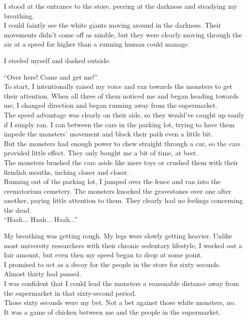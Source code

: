 I stood at the entrance to the store, peering at the darkness and steadying my breathing.\\
I could faintly see the white giants moving around in the darkness. Their movements didn't come off as nimble, but they were clearly moving through the air at a speed far higher than a running human could manage.

I steeled myself and dashed outside.

``Over here! Come and get me!'' \\
To start, I intentionally raised my voice and ran towards the monsters to get their attention. When all three of them noticed me and began heading towards me, I changed direction and began running away from the supermarket. \\
The speed advantage was clearly on their side, so they would've caught up easily if I simply ran. I ran between the cars in the parking lot, trying to have them impede the monsters' movement and block their path even a little bit. \\
But the monsters had enough power to chew straight through a car, so the cars provided little effect. They only bought me a bit of time, at best. \\
The monsters brushed the cars aside like mere toys or crushed them with their fiendish mouths, inching closer and closer. \\
Running out of the parking lot, I jumped over the fence and ran into the crematorium cemetery. The monsters knocked the gravestones over one after another, paying little attention to them. They clearly had no feelings concerning the dead. \\

``Haah... Haah... Haah...''

My breathing was getting rough. My legs were slowly getting heavier. Unlike most university researchers with their chronic sedentary lifestyle, I worked out a fair amount, but even then my speed began to drop at some point. \\
I promised to act as a decoy for the people in the store for sixty seconds. \\
Almost thirty had passed. \\
I was confident that I could lead the monsters a reasonable distance away from the supermarket in that sixty-second period. \\
Those sixty seconds were my bet. Not a bet against those white monsters, no. \\
It was a game of chicken between me and the people in the supermarket.

